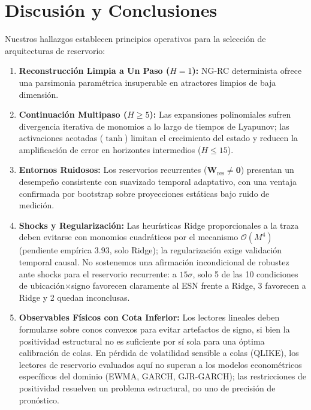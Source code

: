 \documentclass[aip,cha,reprint,amsmath,amssymb]{revtex4-2}
\begin{document}
\section{Discusión y Conclusiones}
\label{sec:discussion}

Nuestros hallazgos establecen principios operativos para la selección de arquitecturas de reservorio:
\begin{enumerate}
    \item \textbf{Reconstrucción Limpia a Un Paso ($H=1$):} NG-RC determinista ofrece una parsimonia paramétrica insuperable en atractores limpios de baja dimensión.
    \item \textbf{Continuación Multipaso ($H \ge 5$):} Las expansiones polinomiales sufren divergencia iterativa de monomios a lo largo de tiempos de Lyapunov; las activaciones acotadas ($\tanh$) limitan el crecimiento del estado y reducen la amplificación de error en horizontes intermedios ($H \le 15$).
    \item \textbf{Entornos Ruidosos:} Los reservorios recurrentes ($\mathbf{W}_{\text{res}} \neq \mathbf{0}$) presentan un desempeño consistente con suavizado temporal adaptativo, con una ventaja confirmada por bootstrap sobre proyecciones estáticas bajo ruido de medición.
    \item \textbf{Shocks y Regularización:} Las heurísticas Ridge proporcionales a la traza deben evitarse con monomios cuadráticos por el mecanismo $\mathcal{O}(M^4)$ (pendiente empírica $3.93$, solo Ridge); la regularización exige validación temporal causal. No sostenemos una afirmación incondicional de robustez ante shocks para el reservorio recurrente: a $15\sigma$, solo 5 de las 10 condiciones de ubicación$\times$signo favorecen claramente al ESN frente a Ridge, 3 favorecen a Ridge y 2 quedan inconclusas.
    \item \textbf{Observables Físicos con Cota Inferior:} Los lectores lineales deben formularse sobre conos convexos para evitar artefactos de signo, si bien la positividad estructural no es suficiente por sí sola para una óptima calibración de colas. En pérdida de volatilidad sensible a colas (QLIKE), los lectores de reservorio evaluados aquí no superan a los modelos econométricos específicos del dominio (EWMA, GARCH, GJR-GARCH); las restricciones de positividad resuelven un problema estructural, no uno de precisión de pronóstico.

\end{enumerate}
\end{document}
